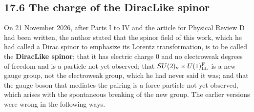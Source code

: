 \documentclass[
  10pt,
]{article}
\begin{document}
\hypertarget{the-charge-of-the-diraclike-spinor}{%
\subsection{17.6 The charge of the DiracLike
spinor}\label{the-charge-of-the-diraclike-spinor}}

On 21 November 2026, after Parts I to IV and the article for Physical
Review D had been written, the author stated that the spinor field of
this work, which he had called a Dirac spinor to emphasize its Lorentz
transformation, is to be called the \textbf{DiracLike spinor}; that it
has electric charge 0 and no electroweak degrees of freedom and is a
particle not yet observed; that
\(SU(2)_{\rm v}\times U(1)^{\rm F}_{\rm LL}\) is a new gauge group, not
the electroweak group, which he had never said it was; and that the
gauge boson that mediates the pairing is a force particle not yet
observed, which arises with the spontaneous breaking of the new group.
The earlier versions were wrong in the following ways.
\end{document}
